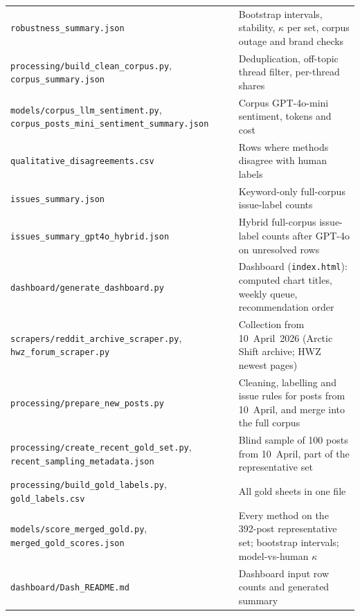 \documentclass[11pt,a4paper]{article}
\begin{document}
\begin{longtable}{@{}p{}p{}@{}}
\texttt{robustness\_\allowbreak{}summary.json} & Bootstrap intervals, stability, $\kappa$ per set, corpus outage and brand checks \\
\texttt{processing/\allowbreak{}build\_\allowbreak{}clean\_\allowbreak{}corpus.py}, \texttt{corpus\_\allowbreak{}summary.json} & Deduplication, off-topic thread filter, per-thread shares \\
\texttt{models/\allowbreak{}corpus\_\allowbreak{}llm\_\allowbreak{}sentiment.py}, \texttt{corpus\_\allowbreak{}posts\_\allowbreak{}mini\_\allowbreak{}sentiment\_\allowbreak{}summary.json} & Corpus GPT-4o-mini sentiment, tokens and cost \\
\texttt{qualitative\_\allowbreak{}disagreements.csv} & Rows where methods disagree with human labels \\
\texttt{issues\_\allowbreak{}summary.json} & Keyword-only full-corpus issue-label counts \\
\texttt{issues\_\allowbreak{}summary\_\allowbreak{}gpt4o\_\allowbreak{}hybrid.json} & Hybrid full-corpus issue-label counts after GPT-4o on unresolved rows \\
\texttt{dashboard/\allowbreak{}generate\_\allowbreak{}dashboard.py} & Dashboard (\texttt{index.html}): computed chart titles, weekly queue, recommendation order \\
\texttt{scrapers/\allowbreak{}reddit\_\allowbreak{}archive\_\allowbreak{}scraper.py}, \texttt{hwz\_\allowbreak{}forum\_\allowbreak{}scraper.py} & Collection from 10~April~2026 (Arctic Shift archive; HWZ newest pages) \\
\texttt{processing/\allowbreak{}prepare\_\allowbreak{}new\_\allowbreak{}posts.py} & Cleaning, labelling and issue rules for posts from 10~April, and merge into the full corpus \\
\texttt{processing/\allowbreak{}create\_\allowbreak{}recent\_\allowbreak{}gold\_\allowbreak{}set.py}, \texttt{recent\_\allowbreak{}sampling\_\allowbreak{}metadata.json} & Blind sample of 100 posts from 10~April, part of the representative set \\
\texttt{processing/\allowbreak{}build\_\allowbreak{}gold\_\allowbreak{}labels.py}, \texttt{gold\_\allowbreak{}labels.csv} & All gold sheets in one file \\
\texttt{models/\allowbreak{}score\_\allowbreak{}merged\_\allowbreak{}gold.py}, \texttt{merged\_\allowbreak{}gold\_\allowbreak{}scores.json} & Every method on the 392-post representative set; bootstrap intervals; model-vs-human $\kappa$ \\
\texttt{dashboard/\allowbreak{}Dash\_\allowbreak{}README.md} & Dashboard input row counts and generated summary \\
\bottomrule
\end{longtable}
\end{document}
